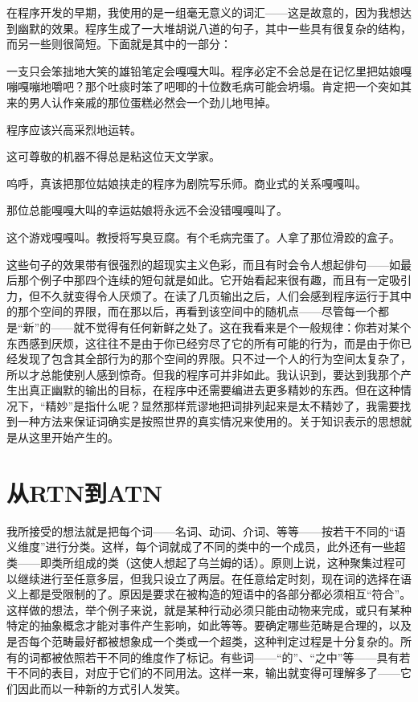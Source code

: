 在程序开发的早期，我使用的是一组毫无意义的词汇——这是故意的，因为我想达到幽默的效果。程序生成了一大堆胡说八道的句子，其中一些具有很复杂的结构，而另一些则很简短。下面就是其中的一部分：

\begin{block}
一支只会笨拙地大笑的雄铅笔定会嘎嘎大叫。程序必定不会总是在记忆里把姑娘嘎嘣嘎嘣地嚼吧？那个吐痰时笨了吧唧的十位数毛病可能会坍塌。肯定把一个突如其来的男人认作亲戚的那位蛋糕必然会一个劲儿地甩掉。

程序应该兴高采烈地运转。

这可尊敬的机器不得总是粘这位天文学家。

呜呼，真该把那位姑娘挟走的程序为剧院写乐师。商业式的关系嘎嘎叫。

那位总能嘎嘎大叫的幸运姑娘将永远不会没错嘎嘎叫了。

这个游戏嘎嘎叫。教授将写臭豆腐。有个毛病完蛋了。人拿了那位滑跤的盒子。
\end{block}
这些句子的效果带有很强烈的超现实主义色彩，而且有时会令人想起俳句——如最后那个例子中那四个连续的短句就是如此。它开始看起来很有趣，而且有一定吸引力，但不久就变得令人厌烦了。在读了几页输出之后，人们会感到程序运行于其中的那个空间的界限，而在那以后，再看到该空间中的随机点——尽管每一个都是“新”的——就不觉得有任何新鲜之处了。这在我看来是个一般规律：你若对某个东西感到厌烦，这往往不是由于你已经穷尽了它的所有可能的行为，而是由于你已经发现了包含其全部行为的那个空间的界限。只不过一个人的行为空间太复杂了，所以才总能使别人感到惊奇。但我的程序可并非如此。我认识到，要达到我那个产生出真正幽默的输出的目标，在程序中还需要编进去更多精妙的东西。但在这种情况下，“精妙”是指什么呢？显然那样荒谬地把词排列起来是太不精妙了，我需要找到一种方法来保证词确实是按照世界的真实情况来使用的。关于知识表示的思想就是从这里开始产生的。

\section{从RTN到ATN}

我所接受的想法就是把每个词——名词、动词、介词、等等——按若干不同的“语义维度”进行分类。这样，每个词就成了不同的类中的一个成员，此外还有一些超类——即类所组成的类（这使人想起了乌兰姆的话）。原则上说，这种聚集过程可以继续进行至任意多层，但我只设立了两层。在任意给定时刻，现在词的选择在语义上都是受限制的了。原因是要求在被构造的短语中的各部分都必须相互“符合”。这样做的想法，举个例子来说，就是某种行动必须只能由动物来完成，或只有某种特定的抽象概念才能对事件产生影响，如此等等。要确定哪些范畴是合理的，以及是否每个范畴最好都被想象成一个类或一个超类，这种判定过程是十分复杂的。所有的词都被依照若干不同的维度作了标记。有些词——“的”、“之中”等——具有若干不同的表目，对应于它们的不同用法。这样一来，输出就变得可理解多了——它们因此而以一种新的方式引人发笑。

